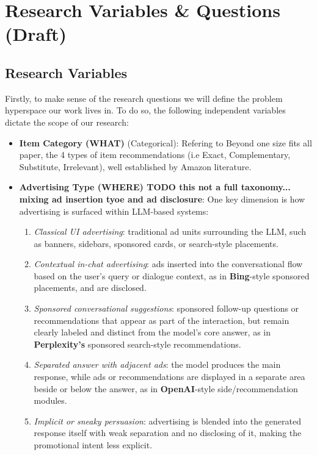 \documentclass{article}
\begin{document}
\newpage

\section{Research Variables \& Questions (Draft)}

\subsection{Research Variables}
Firstly, to make sense of the research questions we will define the problem hyperspace our work lives in. To do so, the following independent variables dictate the scope of our research:

\begin{itemize}
    \item \textbf{Item Category (WHAT)} (Categorical): 
    Refering to Beyond one size fits all paper, the 4 types of item recommendations (i.e Exact, Complementary, Substitute, Irrelevant), well established by Amazon literature. 

    \item \textbf{Advertising Type (WHERE) TODO this not a full taxonomy... mixing ad insertion tyoe and ad disclosure}: One key dimension is how advertising is surfaced within LLM-based systems:
    \begin{enumerate}
        \item \textit{Classical UI advertising}: traditional ad units surrounding the LLM, such as banners, sidebars, sponsored cards, or search-style placements.
        \item \textit{Contextual in-chat advertising}: ads inserted into the conversational flow based on the user’s query or dialogue context, as in \textbf{Bing}-style sponsored placements, and are disclosed.
        \item \textit{Sponsored conversational suggestions}: sponsored follow-up questions or recommendations that appear as part of the interaction, but remain clearly labeled and distinct from the model’s core answer, as in \textbf{Perplexity’s} sponsored search-style recommendations.
        \item \textit{Separated answer with adjacent ads}: the model produces the main response, while ads or recommendations are displayed in a separate area beside or below the answer, as in \textbf{OpenAI}-style side/recommendation modules.
        \item \textit{Implicit or sneaky persuasion}: advertising is blended into the generated response itself with weak separation and no disclosing of it, making the promotional intent less explicit.
    \end{enumerate}
        

\end{itemize}
\end{document}
